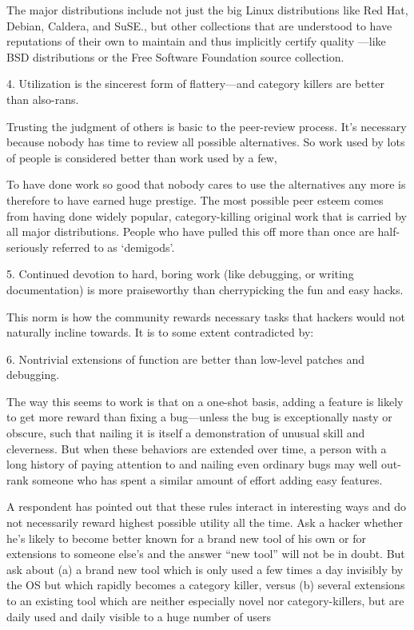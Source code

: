 The major distributions include not just the big Linux distributions like Red Hat, Debian, Caldera, and SuSE., but other collections that are understood to have reputations of their own to maintain and thus implicitly certify quality —like BSD distributions or the Free Software Foundation source collection.

4.  Utilization is the sincerest form of flattery—and category killers are
better than also-rans.

Trusting the judgment of others is basic to the peer-review process.  It's
necessary because nobody has time to review all possible alternatives.  So work
used by lots of people is considered better than work used by a few,

To have done work so good that nobody cares to use the alternatives any more is
therefore to have earned huge prestige.  The most possible peer esteem comes
from having done widely popular, category-killing original work that is carried
by all major distributions.  People who have pulled this off more than once are
half-seriously referred to as `demigods'.

5.  Continued devotion to hard, boring work (like debugging, or writing
documentation) is more praiseworthy than cherrypicking the fun and easy hacks.

This norm is how the community rewards necessary tasks that hackers would not
naturally incline towards.  It is to some extent contradicted by:

6.  Nontrivial extensions of function are better than low-level patches and
debugging.

The way this seems to work is that on a one-shot basis, adding a feature is
likely to get more reward than fixing a bug—unless the bug is exceptionally
nasty or obscure, such that nailing it is itself a demonstration of unusual
skill and cleverness.  But when these behaviors are extended over time, a person
with a long history of paying attention to and nailing even ordinary bugs may
well out-rank someone who has spent a similar amount of effort adding easy
features.

A respondent has pointed out that these rules interact in interesting ways and
do not necessarily reward highest possible utility all the time.  Ask a hacker
whether he's likely to become better known for a brand new tool of his own or
for extensions to someone else's and the answer ``new tool'' will not be in
doubt.  But ask about (a) a brand new tool which is only used a few times a day
invisibly by the OS but which rapidly becomes a category killer, versus (b)
several extensions to an existing tool which are neither especially novel nor
category-killers, but are daily used and daily visible to a huge number of users

